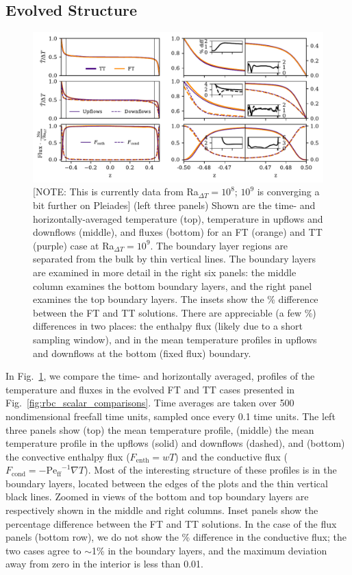 \documentclass[aps, pre, onecolumn, nofootinbib, notitlepage, groupedaddress, amsfonts, amssymb, amsmath, longbibliography, superscriptaddress]{revtex4-1}
\newcommand{\grad}{\ensuremath{\nabla}}
\newcommand{\Peff}{\ensuremath{\text{Pe}_{\text{ff}}}}
\begin{document}
\subsection{Evolved Structure}
\begin{figure}
\includegraphics[width=\textwidth]{./figs/rbc_1D_profiles.pdf}
\caption{ 
	[NOTE: This is currently data from Ra$_{\Delta T} = 10^8$; $10^9$ is converging a bit further on Pleiades]
	(left three panels) Shown are the time- and horizontally-averaged temperature (top), temperature in upflows and downflows (middle), and fluxes (bottom) for an FT (orange) and TT (purple) case at Ra$_{\Delta T} = 10^{9}$.
	The boundary layer regions are separated from the bulk by thin vertical lines.
	The boundary layers are examined in more detail in the right six panels: the middle column examines the bottom boundary layers, and the right panel examines the top boundary layers.
	The insets show the \% difference between the FT and TT solutions.
	There are appreciable (a few \%) differences in two places: the enthalpy flux (likely due to a short sampling window), and in the mean temperature profiles in upflows and downflows at the bottom (fixed flux) boundary.	
\label{fig:rbc_1D_profiles} }
\end{figure}

In Fig.~\ref{fig:rbc_1D_profiles}, we compare the time- and horizontally averaged, profiles of the temperature and fluxes in the evolved FT and TT cases presented in Fig.~\ref{fig:rbc_scalar_comparisons}.
Time averages are taken over 500 nondimensional freefall time units, sampled once every 0.1 time units.
The left three panels show (top) the mean temperature profile, (middle) the mean temperature profile in the upflows (solid) and downflows (dashed), and (bottom) the convective enthalpy flux ($F_{\text{enth}} = wT$) and the conductive flux ($F_{\text{cond}} = -\Peff^{-1}\grad T$).
Most of the interesting structure of these profiles is in the boundary layers, located between the edges of the plots and the thin vertical black lines.
Zoomed in views of the bottom and top boundary layers are respectively shown in the middle and right columns.
Inset panels show the percentage difference between the FT and TT solutions.
In the case of the flux panels (bottom row), we do not show the \% difference in the conductive flux; the two cases agree to $\sim$1\% in the boundary layers, and the maximum deviation away from zero in the interior is less than 0.01. 
\end{document}
